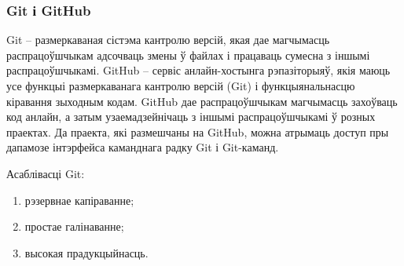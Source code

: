 \subsubsection{Git і GitHub}

Git -- размеркаваная сістэма кантролю версій, якая дае магчымасць
распрацоўшчыкам адсочваць змены ў файлах і працаваць сумесна з іншымі
распрацоўшчыкамі.
GitHub -- сервіс анлайн-хостынга рэпазіторыяў, якія маюць усе функцыі
размеркаванага кантролю версій (Git) і функцыянальнасцю кіравання
зыходным кодам. GitHub дае распрацоўшчыкам магчымасць захоўваць
код анлайн, а затым узаемадзейнічаць з іншымі распрацоўшчыкамі ў
розных праектах.
Да праекта, які размешчаны на GitHub, можна атрымаць доступ пры
дапамозе інтэрфейса каманднага радку Git і Git-каманд.

Асаблівасці Git:
\begin{enumerate}
    \item рэзервнае капіраванне;
    \item простае галінаванне;
    \item высокая прадукцыйнасць.
\end{enumerate}
